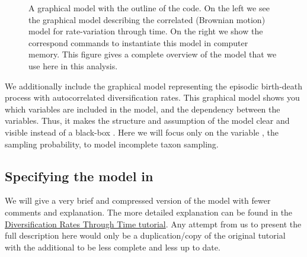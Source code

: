 \begin{figure}[h!]
\centering
{}
\caption{\small A graphical model with the outline of the \Rev code. On the left we see the graphical model describing the correlated (Brownian motion) model for rate-variation through time. On the right we show the correspond \Rev commands to instantiate this model in computer memory. This figure gives a complete overview of the model that we use here in this analysis.}
\label{fig:EBD_GM}
\end{figure}
We additionally include the graphical model representing the episodic birth-death process with autocorrelated diversification rates.
This graphical model shows you which variables are included in the model, and the dependency between the variables.
Thus, it makes the structure and assumption of the model clear and visible instead of a black-box \citep{Hoehna2014b}.
Here we will focus only on the variable , the sampling probability, to model incomplete taxon sampling.


\subsection{Specifying the model in \Rev}
We will give a very brief and compressed version of the model with fewer comments and explanation.
The more detailed explanation can be found in the \href{https://github.com/revbayes/revbayes_tutorial/raw/master/tutorial_TeX/RB_DiversificationRate_Episodic_Tutorial/RB_DiversificationRate_Episodic_Tutorial.pdf}{Diversification Rates Through Time tutorial}.
Any attempt from us to present the full description here would only be a duplication/copy of the original tutorial with the additional to be less complete and less up to date.


